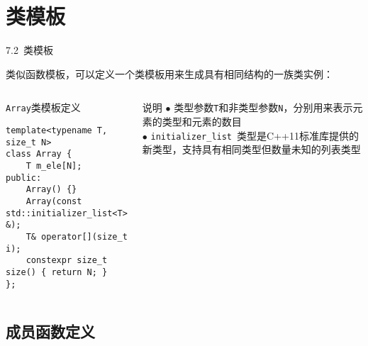 \section{类模板}


\begin{frame}[fragile]{7.2~类模板}

类似函数模板，可以定义一个类模板用来生成具有\alert{相同结构}的一族类实例：

\vspace{-4mm}

\begin{columns}[t]

\begin{blueblock}{\texttt{Array}类模板定义}
\begin{lstlisting}[moreemph={T}]
template<typename T, size_t N>
class Array {
    T m_ele[N];
public:
    Array() {}
    Array(const std::initializer_list<T> &);
    T& operator[](size_t i);
    constexpr size_t size() { return N; }
};
\end{lstlisting}
\end{blueblock}

\begin{yellowblock}{说明}
$\bullet$ 类型参数\texttt{T}和非类型参数\texttt{N}，分别用来表示元素的类型和元素的数目\\
$\bullet$ \alert{\texttt{initializer\_list}}~类型是C++11标准库提供的新类型，支持具有相同类型但数量未知的列表类型
\end{yellowblock}

\end{columns}

\end{frame}


\subsection{成员函数定义}


